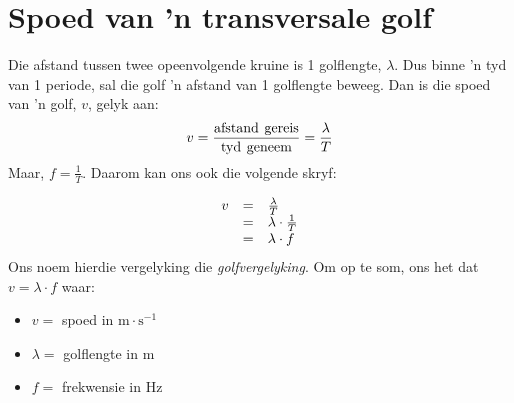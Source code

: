     \noindent
      \label{m38806*uid21}
            \section{Spoed van 'n transversale golf}
            \nopagebreak
   
        \label{m38806*id319706}Die afstand tussen twee opeenvolgende kruine is 1 golflengte, $\lambda $. Dus binne 'n tyd van 1
    periode, sal die golf  'n afstand van 1 golflengte beweeg. Dan is die spoed van  'n golf, $v$, gelyk aan:
        \label{m38806*id319732}\nopagebreak\noindent{}
    \begin{equation}\nonumber
    v=\frac{\text{afstand}\phantom{\rule{4.pt}{0ex}}\text{gereis}}{\text{tyd}\phantom{\rule{4.pt}{0ex}}\text{geneem}}=\frac{\lambda }{T}
      \end{equation}
        \label{m38806*id319776}Maar, $f=\frac{1}{T}$. Daarom kan ons ook die volgende skryf: 
        \label{m38806*id319802}\nopagebreak\noindent{}
          
    \begin{equation}\nonumber
    \begin{array}{ccc}\hfill v& =& \frac{\lambda }{T}\hfill \\ & =& \lambda \ensuremath{\cdot}\frac{1}{T}\hfill \\ & =& \lambda \ensuremath{\cdot}f\hfill \end{array}
      \end{equation}
        \label{m38806*id319870}Ons noem hierdie vergelyking die \textsl{golfvergelyking}. Om op te som, ons het dat $v=\lambda \ensuremath{\cdot}f$ waar: 
        \label{m38806*id319901}\begin{itemize}[noitemsep]
            \label{m38806*uid22}\item $v=$ spoed in $\text{m}\ensuremath{\cdot}\text{s}{}^{-1}$\label{m38806*uid23}\item $\lambda =$ golflengte in $\text{m}$
\label{m38806*uid24}\item $f=$ frekwensie in $\text{Hz}$
\end{itemize}


